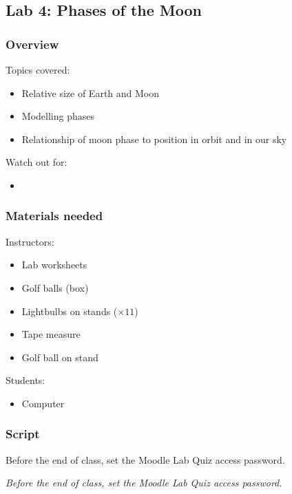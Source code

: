 \documentclass[12pt]{article}
\begin{document}
\newpage
\subsection{Lab 4: Phases of the Moon}

\subsubsection{Overview}

Topics covered:
\begin{itemize}
\item Relative size of Earth and Moon
\item Modelling phases
\item Relationship of moon phase to position in orbit and in our sky
\end{itemize}

\noindent
Watch out for:
\begin{itemize}
\item 
\end{itemize}


\subsubsection{Materials needed}

Instructors:
\begin{itemize}
\item Lab worksheets
\item Golf balls (box)
\item Lightbulbs on stands ($\times 11$)
\item Tape measure
\item Golf ball on stand
\end{itemize}

\noindent
Students:
\begin{itemize}
\item Computer
\end{itemize}


\subsubsection{Script}

Before the end of class, set the Moodle Lab Quiz access password.


\emph{Before the end of class, set the Moodle Lab Quiz access password.}
\end{document}
